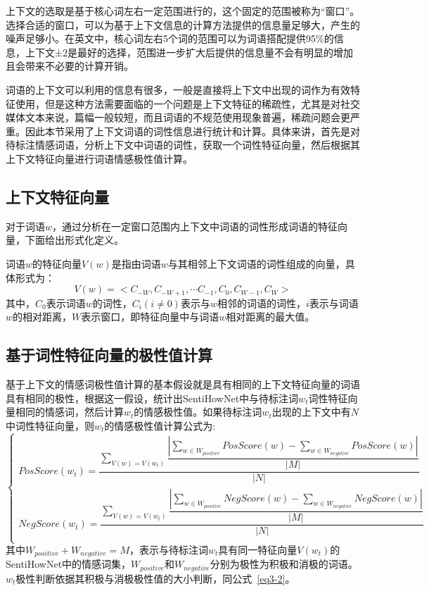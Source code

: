 上下文的选取是基于核心词左右一定范围进行的，这个固定的范围被称为“窗口”。选择合适的窗口，可以为基于上下文信息的计算方法提供的信息量足够大，产生的噪声足够小。在英文中，核心词左右5个词的范围可以为词语搭配提供95\%的信息，上下文±2是最好的选择，范围进一步扩大后提供的信息量不会有明显的增加且会带来不必要的计算开销。

词语的上下文可以利用的信息有很多，一般是直接将上下文中出现的词作为有效特征使用，但是这种方法需要面临的一个问题是上下文特征的稀疏性，尤其是对社交媒体文本来说，篇幅一般较短，而且词语的不规范使用现象普遍，稀疏问题会更严重。因此本节采用了上下文词语的词性信息进行统计和计算。具体来讲，首先是对待标注情感词语，分析上下文中词语的词性，获取一个词性特征向量，然后根据其上下文特征向量进行词语情感极性值计算。

\subsection{上下文特征向量}
对于词语$w$，通过分析在一定窗口范围内上下文中词语的词性形成词语的特征向量，下面给出形式化定义。
\begin{definition}
词语$w$的特征向量$V(w)$是指由词语$w$与其相邻上下文词语的词性组成的向量，具体形式为：
$$V(w)=<C_{-W},C_{-W+1},\cdots C_{-1},C_0,C_{W-1},C_W>$$
其中，$C_0$表示词语$w$的词性，$C_i(i\neq 0)$表示与$w$相邻的词语的词性，$i$表示与词语$w$的相对距离，$W$表示窗口，即特征向量中与词语$w$相对距离的最大值。
\end{definition}

\subsection{基于词性特征向量的极性值计算}
基于上下文的情感词极性值计算的基本假设就是具有相同的上下文特征向量的词语具有相同的极性，根据这一假设，统计出SentiHowNet中与待标注词$ w_t$词性特征向量相同的情感词，然后计算$ w_t $的情感极性值。如果待标注词$ w_t$出现的上下文中有$ N $中词性特征向量，则$ w_t$的情感极性值计算公式为:
\begin{equation}
\label{eq3-2-1}
\begin{cases}
PosScore(w_t)=\dfrac{\sum_{V(w)=V(w_t)}\dfrac{|\sum_{w \in W_{positive}}PosScore(w)-\sum_{w \in W_{negative}}PosScore(w)|}{|M|}}{|N|} \\
NegScore(w_t)=\dfrac{\sum_{V(w)=V(w_t)}\dfrac{|\sum_{w \in W_{positive}}NegScore(w)-\sum_{w \in W_{negative}}NegScore(w)|}{|M|}}{|N|} \\
\end{cases}
\end{equation}
其中$W_{positive}+W_{negative}=M$，表示与待标注词$w_t$具有同一特征向量$ V(w_t) $的SentiHowNet中的情感词集，$W_{positive}$和$W_{negative}$分别为极性为积极和消极的词语。$w_t$极性判断依据其积极与消极极性值的大小判断，同公式~\ref{eq3-2}。

